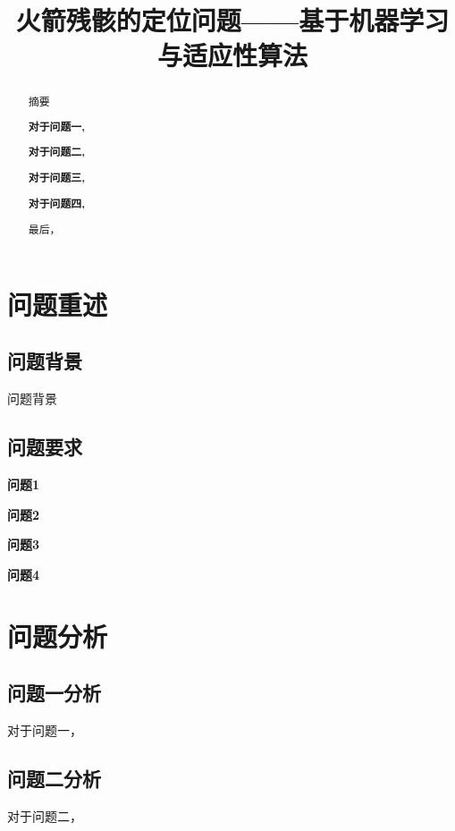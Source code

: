 \documentclass[withoutpreface,bwprint]{cumcmthesis}
\title{火箭残骸的定位问题——基于机器学习与适应性算法}  %
\begin{document}
\maketitle
\begin{abstract}
摘要

\textbf{对于问题一,}

\textbf{对于问题二,}

\textbf{对于问题三,}

\textbf{对于问题四,}

最后，



\end{abstract}


\section{问题重述}
\subsection{问题背景}
问题背景


\subsection{问题要求}

\textbf{问题1}  

\textbf{问题2}  

\textbf{问题3} 

\textbf{问题4}  


\section{问题分析}
\subsection{问题一分析}
对于问题一，

\subsection{问题二分析}	
对于问题二，
\end{document}
